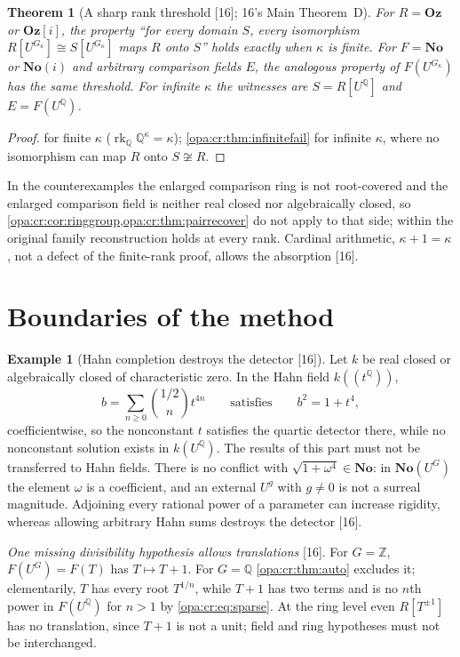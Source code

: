 \documentclass[11pt,oneside]{article}
\numberwithin{equation}{section}
\newtheorem{theorem}{Theorem}[section]
\theoremstyle{definition}
\newtheorem{example}[example]{Example}
\theoremstyle{remark}
\newcommand{\No}{\mathbf{No}}
\newcommand{\Oz}{\mathbf{Oz}}
\newcommand{\Og}{\mathbf{Oz}[i]}
\newcommand{\SC}{\mathbf{No}(i)}
\newcommand{\Q}{\mathbb Q}
\newcommand{\Z}{\mathbb Z}
\newcommand{\Hahn}[2]{#1((t^{#2}))}
\newcommand{\src}[1]{\textup{\textsf{\small[#1]}}}
\begin{document}
\begin{theorem}[A sharp rank threshold \src{16}; 16's Main Theorem~D]\label{opa:cr:thm:threshold}
For $R=\Oz$ or $\Og$, the property ``for every domain $S$, every isomorphism $R[U^{G_\kappa}]\cong S[U^{G_\kappa}]$ maps $R$ onto
$S$'' holds exactly when $\kappa$ is finite. For $F=\No$ or $\SC$ and arbitrary comparison fields $E$, the analogous property
of $F(U^{G_\kappa})$ has the same threshold. For infinite $\kappa$ the witnesses are $S=R[U^\Q]$ and $E=F(U^\Q)$.
\end{theorem}
\begin{proof}
 for finite $\kappa$ ($\operatorname{rk}_\Q\Q^\kappa=\kappa$); \cref{opa:cr:thm:infinitefail}
for infinite $\kappa$, where no isomorphism can map $R$ onto $S\not\cong R$.
\end{proof}

In the counterexamples the enlarged comparison ring is not root-covered and the enlarged comparison field is neither real
closed nor algebraically closed, so \cref{opa:cr:cor:ringgroup,opa:cr:thm:pairrecover} do not apply to that side; within the
original family reconstruction holds at every rank. Cardinal arithmetic, $\kappa+1=\kappa$, not a defect of the finite-rank
proof, allows the absorption \src{16}.

\section{Boundaries of the method}\label{opa:cr:sec:boundaries}

\begin{example}[Hahn completion destroys the detector \src{16}]\label{opa:cr:ex:hahn}
Let $k$ be real closed or algebraically closed of characteristic zero. In the Hahn field $\Hahn k\Q$,
\[
 b=\sum_{n\ge0}\binom{1/2}{n}t^{4n}\qquad\text{satisfies}\qquad b^2=1+t^4,
\]
coefficientwise, so the nonconstant $t$ satisfies the quartic detector there, while no nonconstant solution exists in
$k(U^\Q)$. The results of this part must not be transferred to Hahn fields. There is no conflict with
$\sqrt{1+\omega^4}\in\No$: in $\No(U^G)$ the element $\omega$ is a coefficient, and an external $U^g$ with $g\ne0$ is not a
surreal magnitude. Adjoining every rational power of a parameter can increase rigidity, whereas allowing arbitrary Hahn
sums destroys the detector \src{16}.
\end{example}

\emph{One missing divisibility hypothesis allows translations} \src{16}. For $G=\Z$, $F(U^G)=F(T)$ has $T\mapsto T+1$. For
$G=\Q$ \cref{opa:cr:thm:auto} excludes it; elementarily, $T$ has every root $T^{1/n}$, while $T+1$ has two terms and is no
$n$th power in $F(U^\Q)$ for $n>1$ by \eqref{opa:cr:eq:sparse}. At the ring level even $R[T^{\pm1}]$ has no translation, since
$T+1$ is not a unit; field and ring hypotheses must not be interchanged.
\end{document}
